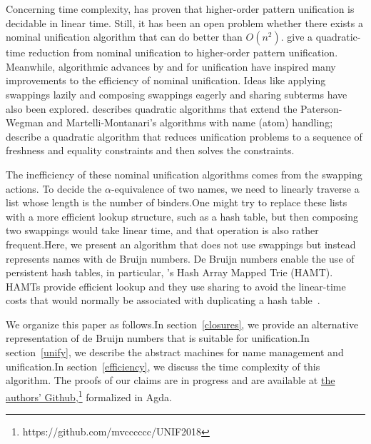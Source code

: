 \documentclass[a4paper,UKenglish]{lipics-v2016}
\begin{document}
Concerning time complexity, \citet{qian_unification_1996} has proven that
higher-order pattern unification is decidable in linear time.
Still, it has been an open problem whether there exists a nominal
unification algorithm that can do better than
$O(n^2)$. \citet{levy_nominal_2012} give a quadratic-time reduction
from nominal unification to higher-order pattern unification.
Meanwhile, algorithmic advances by \citet{paterson_linear_1978} and
\citet{martelli_efficient_1982} for unification have inspired many
improvements to the efficiency of nominal unification. Ideas
like applying swappings lazily and composing swappings eagerly and
sharing subterms have also been explored. \citet{calves_complexity_2010}
describes quadratic algorithms that extend the Paterson-Wegman and
Martelli-Montanari's algorithms with name (atom) handling;
\citet{levy_efficient_2010} describe a quadratic algorithm that
reduces unification problems to a sequence of freshness and equality
constraints and then solves the constraints.

The inefficiency of these nominal unification algorithms comes from
the swapping actions. To decide the $\alpha$-equivalence of
two names, we need to linearly traverse a list whose length 
is the number of binders.One might try to replace these
lists with a more efficient lookup structure, such as a hash table,
but then composing two swappings would take linear time, and that
operation is also rather frequent.Here, we present an algorithm that
does not use swappings but instead represents names with de Bruijn
numbers. De Bruijn numbers enable the use of persistent hash tables, in
particular, \citeauthor{bagwell_ideal_2001}'s Hash Array Mapped Trie
(HAMT). HAMTs provide efficient lookup and
they use sharing to avoid the linear-time costs that would normally be
associated with duplicating a hash table~\citep{bagwell_ideal_2001}.

We organize this paper as follows.In section~\ref{closures}, we provide
an alternative representation of de Bruijn numbers that is suitable
for unification.In section~\ref{unify}, we describe the abstract
machines for name management and unification.In
section~\ref{efficiency}, we discuss the time complexity of this
algorithm. The proofs of our claims are in progress and are available
at \href{https://github.com/mvcccccc/UNIF2018}{the authors' Github},\footnote{https://github.com/mvcccccc/UNIF2018}
formalized in Agda.
\end{document}
